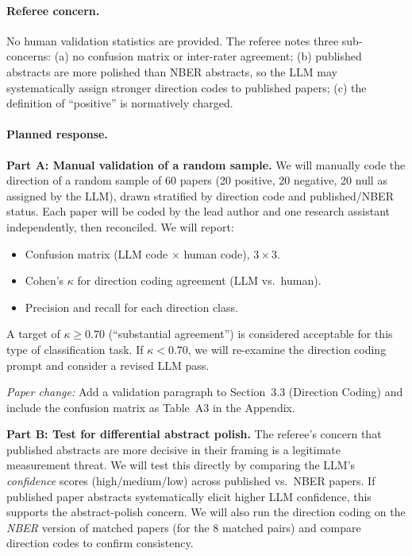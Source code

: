\documentclass[12pt]{article}
\begin{document}
\paragraph{Referee concern.}
No human validation statistics are provided.  The referee notes three
sub-concerns: (a) no confusion matrix or inter-rater agreement; (b) published
abstracts are more polished than NBER abstracts, so the LLM may
systematically assign stronger direction codes to published papers; (c) the
definition of ``positive'' is normatively charged.

\paragraph{Planned response.}

\textbf{Part A: Manual validation of a random sample.}
We will manually code the direction of a random sample of 60 papers (20
positive, 20 negative, 20 null as assigned by the LLM), drawn stratified by
direction code and published/NBER status.  Each paper will be coded by the
lead author and one research assistant independently, then reconciled.  We
will report:

\begin{itemize}
  \item Confusion matrix (LLM code $\times$ human code), $3 \times 3$.
  \item Cohen's $\kappa$ for direction coding agreement (LLM vs.\ human).
  \item Precision and recall for each direction class.
\end{itemize}

A target of $\kappa \geq 0.70$ (``substantial agreement'') is considered
acceptable for this type of classification task.  If $\kappa < 0.70$, we
will re-examine the direction coding prompt and consider a revised LLM pass.

\textit{Paper change:} Add a validation paragraph to Section~3.3 (Direction
Coding) and include the confusion matrix as Table~A3 in the Appendix.

\textbf{Part B: Test for differential abstract polish.}
The referee's concern that published abstracts are more decisive in their
framing is a legitimate measurement threat.  We will test this directly by
comparing the LLM's \textit{confidence} scores (high/medium/low) across
published vs.\ NBER papers.  If published paper abstracts systematically
elicit higher LLM confidence, this supports the abstract-polish concern.
We will also run the direction coding on the \textit{NBER} version of matched
papers (for the 8 matched pairs) and compare direction codes to confirm
consistency.
\end{document}
